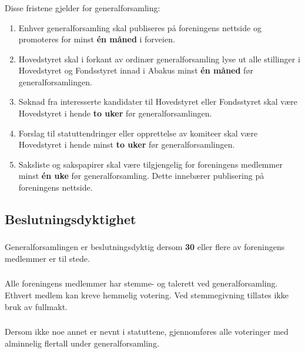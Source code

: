 \subsubsection{}
Disse fristene gjelder for generalforsamling:
\begin{enumerate}[label=\alph*)]
    \item Enhver generalforsamling skal publiseres på foreningens nettside og promoteres for minst \textbf{én måned} i forveien.
    \item Hovedstyret skal i forkant av ordinær generalforsamling lyse ut alle stillinger i Hovedstyret og
    Fondsstyret innad i Abakus minst \textbf{én måned} før generalforsamlingen.
    \item Søknad fra interesserte kandidater til Hovedstyret eller Fondsstyret skal være Hovedstyret
    i hende \textbf{to uker} før generalforsamlingen.
    \item Forslag til statuttendringer eller opprettelse av komiteer skal være Hovedstyret i
    hende minst \textbf{to uker} før generalforsamlingen.
    \item Saksliste og sakspapirer skal være tilgjengelig for foreningens medlemmer minst \textbf{én uke}
    før generalforsamling. Dette innebærer publisering på foreningens nettside.
\end{enumerate}

\subsection{Beslutningsdyktighet}
\subsubsection{}
Generalforsamlingen er beslutningsdyktig dersom \textbf{30} eller flere av foreningens medlemmer er til stede.

\subsubsection{}
Alle foreningens medlemmer har stemme- og talerett ved generalforsamling. Ethvert medlem kan kreve hemmelig votering.
Ved stemmegivning tillates ikke bruk av fullmakt.

\subsubsection{}
Dersom ikke noe annet er nevnt i statuttene, gjennomføres alle voteringer med alminnelig flertall under generalforsamling.

